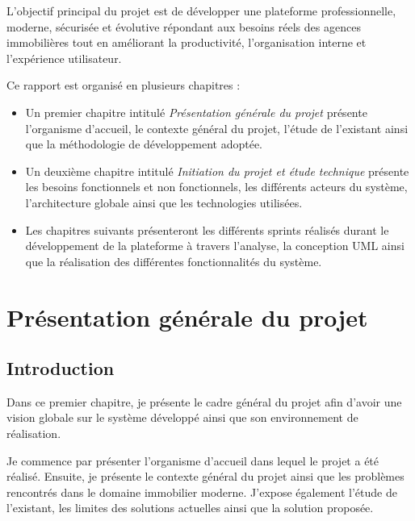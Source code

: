 \documentclass[a4paper,12pt]{report}
\begin{document}
L'objectif principal du projet est de développer une plateforme professionnelle, moderne, sécurisée et évolutive répondant aux besoins réels des agences immobilières tout en améliorant la productivité, l'organisation interne et l'expérience utilisateur.

Ce rapport est organisé en plusieurs chapitres :

\begin{itemize}
\item Un premier chapitre intitulé \textit{Présentation générale du projet} présente l'organisme d'accueil, le contexte général du projet, l'étude de l'existant ainsi que la méthodologie de développement adoptée.

\item Un deuxième chapitre intitulé \textit{Initiation du projet et étude technique} présente les besoins fonctionnels et non fonctionnels, les différents acteurs du système, l'architecture globale ainsi que les technologies utilisées.

\item Les chapitres suivants présenteront les différents sprints réalisés durant le développement de la plateforme à travers l'analyse, la conception UML ainsi que la réalisation des différentes fonctionnalités du système.
\end{itemize}

\endgroup


\chapter{Présentation générale du projet}

\minitoc


\section{Introduction}

Dans ce premier chapitre, je présente le cadre général du projet afin d'avoir une vision globale sur le système développé ainsi que son environnement de réalisation.

Je commence par présenter l'organisme d'accueil dans lequel le projet a été réalisé. Ensuite, je présente le contexte général du projet ainsi que les problèmes rencontrés dans le domaine immobilier moderne. J'expose également l'étude de l'existant, les limites des solutions actuelles ainsi que la solution proposée.
\end{document}
